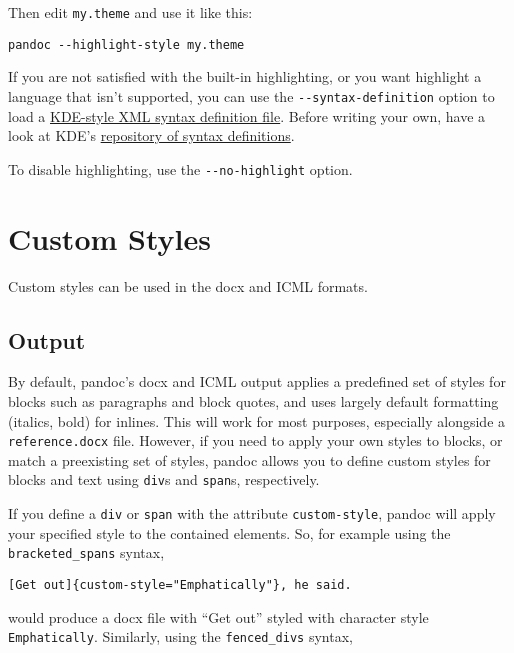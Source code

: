 Then edit \texttt{my.theme} and use it like this:

\begin{verbatim}
pandoc --highlight-style my.theme
\end{verbatim}

If you are not satisfied with the built-in highlighting, or you want
highlight a language that isn't supported, you can use the
\texttt{-\/-syntax-definition} option to load a
\href{https://docs.kde.org/stable5/en/applications/katepart/highlight.html}{KDE-style
XML syntax definition file}. Before writing your own, have a look at
KDE's
\href{https://github.com/KDE/syntax-highlighting/tree/master/data/syntax}{repository
of syntax definitions}.

To disable highlighting, use the \texttt{-\/-no-highlight} option.

\hypertarget{custom-styles}{%
\section{Custom Styles}\label{custom-styles}}

Custom styles can be used in the docx and ICML formats.

\hypertarget{output}{%
\subsection{Output}\label{output}}

By default, pandoc's docx and ICML output applies a predefined set of
styles for blocks such as paragraphs and block quotes, and uses largely
default formatting (italics, bold) for inlines. This will work for most
purposes, especially alongside a \texttt{reference.docx} file. However,
if you need to apply your own styles to blocks, or match a preexisting
set of styles, pandoc allows you to define custom styles for blocks and
text using \texttt{div}s and \texttt{span}s, respectively.

If you define a \texttt{div} or \texttt{span} with the attribute
\texttt{custom-style}, pandoc will apply your specified style to the
contained elements. So, for example using the \texttt{bracketed\_spans}
syntax,

\begin{verbatim}
[Get out]{custom-style="Emphatically"}, he said.
\end{verbatim}

would produce a docx file with ``Get out'' styled with character style
\texttt{Emphatically}. Similarly, using the \texttt{fenced\_divs}
syntax,

